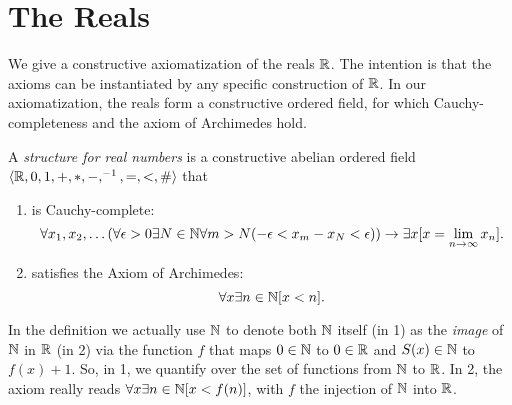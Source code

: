 
\section{The Reals}
We give a constructive axiomatization of the reals $\mathbb{R}$. The
intention is that the axioms can be instantiated by any specific
construction of $\mathbb{R}$. In our axiomatization, the reals form a
constructive ordered field, for which Cauchy-completeness and the
axiom of Archimedes hold.

\begin{definition} A {\em structure for real numbers\/} is a
constructive abelian ordered field 
$\langle \mathbb{R}, 0, 1, +, *, -, ^{-1}, =, <, \mathrel{\#}\rangle$ that
\begin{enumerate}
\item is Cauchy-complete:
$$\forall x_1, x_2,\ldots 
        (\forall \epsilon>0 \exists N\in\mathbb{N} \forall m>N(-\epsilon <x_m - x_N <
        \epsilon))
        \rightarrow
        \exists x [x = \lim_{n\rightarrow\infty} x_n].$$
\item satisfies the Axiom of Archimedes:
$$\forall x\exists n\in\mathbb{N}[x<n].$$
\end{enumerate}
\end{definition}

\begin{remark}
 In the definition we actually use $\mathbb{N}$ to denote both $\mathbb{N}$
  itself (in 1) as the {\em image\/} of
  $\mathbb{N}$ in $\mathbb{R}$ (in 2) via the function $f$ that maps $0\in\mathbb{N}$ to $0\in\mathbb{R}$
  and $S(x) \in \mathbb{N}$ to $f(x) +1$. So, in 1, we quantify over the set
  of functions from $\mathbb{N}$ to $\mathbb{R}$. In 2, the axiom really reads
  $\forall x\exists n\in\mathbb{N}[x<f(n)]$, with $f$ the injection of $\mathbb{N}$
  into $\mathbb{R}$.
\end{remark}




